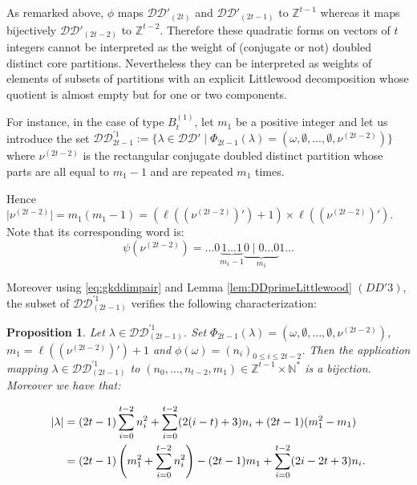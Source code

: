 \documentclass[11pt,letterpaper]{amsart}
\def\bbbz{\mathbb Z}
\def\bbbn{\mathbb N}
\def\ccdd{\mathcal {DD}}
\newtheorem{prop}[df]{Proposition}		%
\numberwithin{equation}{section}
\numberwithin{df}{section}
\begin{document}
 As remarked above, $\phi$ maps $\ccdd'_{(2t)}$ and $\ccdd'_{(2t-1)}$ to $\bbbz^{t-1}$ whereas it maps bijectively $\ccdd'_{(2t-2)}$ to $\bbbz^{t-2}$. Therefore these quadratic forms on vectors of $t$ integers cannot be interpreted as the weight of (conjugate or not) doubled distinct core partitions. Nevertheless they can be interpreted as weights of elements of subsets of partitions with an explicit Littlewood decomposition whose quotient is almost empty but for one or two components.

For instance, in the case of type $B^{(1)}_{t}$, let $m_1$ be a positive integer and let us introduce the set $\ccdd_{2t-1}^{'1}:=\lbrace \lambda\in\ccdd'\mid \Phi_{2t-1}(\lambda)=(\omega,\emptyset,\dots,\emptyset,\nu^{(2t-2)})\rbrace$ where $\nu^{(2t-2)}$ is the rectangular conjugate doubled distinct partition whose parts are all equal to $m_1-1$ and are repeated $m_1$ times.

 Hence $\lvert\nu^{(2t-2)}\rvert=m_1(m_1-1)=(\ell(\left(\nu^{(2t-2)}\right)')+1)\times \ell(\left(\nu^{(2t-2)}\right)')$. Note that its corresponding word is:
\begin{equation}\label{eq:nu0typeb}
\psi(\nu^{(2t-2)})=\dots 0\underbrace{1\dots 1}_{m_1-1}\underbrace{0\mid 0\dots  0}_{m_1}1\dots
\end{equation}

Moreover using \eqref{eq:gkddimpair} and Lemma \ref{lem:DDprimeLittlewood} $(DD'3)$, the subset of $\ccdd^{'1}_{(2t-1)}$ verifies the following characterization:
\begin{prop}\label{prop:ddprime2t-1}
Let $\lambda\in \ccdd^{'1}_{(2t-1)}$. Set $\Phi_{2t-1}(\lambda)=(\omega,\emptyset,\dots,\emptyset,\nu^{(2t-2)})$, $m_1=\ell(\left(\nu^{(2t-2)}\right)')+1$ and $\phi(\omega)=(n_i)_{0\leq i\leq 2t-2}$. Then the application mapping $\lambda\in\ccdd^{'1}_{(2t-1)}$ to $(n_0,\dots, n_{t-2},m_1)\in\mathbb{Z}^{t-1}\times\mathbb{N}^*$ is a bijection. Moreover we have that:

\begin{align}
\lvert \lambda \rvert &=(2t-1)\sum_{i=0}^{t-2}n_i^2+\sum_{i=0}^{t-2}(2(i-t)+3)n_i+(2t-1)(m_1^2-m_1)\notag\\
&=(2t-1)\left(m_1^2+\sum_{i=0}^{t-2}n_i^2\right)-(2t-1)m_1+\sum_{i=0}^{t-2}(2i-2t+3)n_i.\label{eq:gkddnuimpair}
\end{align}
\end{prop}


\end{document}
